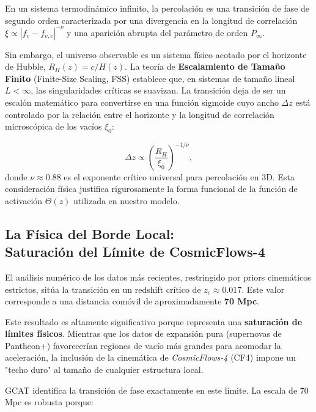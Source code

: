 \documentclass[12pt, a4paper]{article}
\theoremstyle{plain}
\theoremstyle{definition}
\begin{document}
En un sistema termodinámico infinito, la percolación es una transición de fase de segundo orden caracterizada por una divergencia en la longitud de correlación $\xi \propto |f_v - f_{v,c}|^{-\nu}$ y una aparición abrupta del parámetro de orden $P_{\infty}$.

Sin embargo, el universo observable es un sistema físico acotado por el horizonte de Hubble, $R_H(z) = c/H(z)$. La teoría de \textbf{Escalamiento de Tamaño Finito} (Finite-Size Scaling, FSS) establece que, en sistemas de tamaño lineal $L < \infty$, las singularidades críticas se suavizan. La transición deja de ser un escalón matemático para convertirse en una función sigmoide cuyo ancho $\Delta z$ está controlado por la relación entre el horizonte y la longitud de correlación microscópica de los vacíos $\xi_0$:

\begin{equation}
\Delta z \propto \left(\frac{R_H}{\xi_0}\right)^{-1/\nu},
\label{eq:fss_width}
\end{equation}
donde $\nu \approx 0.88$ es el exponente crítico universal para percolación en 3D. Esta consideración física justifica rigurosamente la forma funcional de la función de activación $\Theta(z)$ utilizada en nuestro modelo.

\subsection[La Física del Borde Local: Saturación del Límite de CosmicFlows-4]{La Física del Borde Local: \\ Saturación del Límite de CosmicFlows-4}

El análisis numérico de los datos más recientes, restringido por priors cinemáticos estrictos, sitúa la transición en un redshift crítico de \textbf{$z_c \approx 0.017$}. Este valor corresponde a una distancia comóvil de aproximadamente \textbf{70 Mpc}.

Este resultado es altamente significativo porque representa una \textbf{saturación de límites físicos}. Mientras que los datos de expansión pura (supernovas de Pantheon+) favorecerían regiones de vacío más grandes para acomodar la aceleración, la inclusión de la cinemática de \textit{CosmicFlows-4} (CF4) impone un "techo duro" al tamaño de cualquier estructura local.

GCAT identifica la transición de fase exactamente en este límite. La escala de 70 Mpc es robusta porque:
\end{document}
